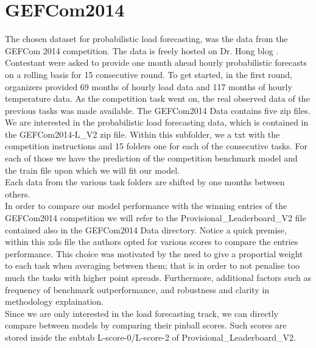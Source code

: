 \section{GEFCom2014}
The chosen dataset for probabilistic load forecasting, was the data from the GEFCom 2014 competition. The data is freely hosted on Dr. Hong blog \cite{hong2016probabilistic}.
Contestant were asked to provide one month ahead hourly probabilistic forecasts on a rolling basis for 15 consecutive round. To get started, in the first round, organizers provided 69 months of hourly load data and 117 months of hourly temperature data. As the competition task went on, the real observed data of the previous tasks was made available.
The GEFCom2014 Data contains five zip files. We are interested in the probabilistic load forecasting data, which is contained in the GEFCom2014-L\_V2 zip file. Within this subfolder, we a txt with the competition instructions and 15 folders one for each of the consecutive tasks. For each of those we have the prediction of the competition benchmark model and the train file upon which we will fit our model.
\\
Each data from the various task folders are shifted by one months between others.
\\
In order to compare our model performance with the winning entries of the GEFCom2014 competition we will refer to the Provisional\_Leaderboard\_V2 file contained also in the GEFCom2014 Data directory. Notice a quick premise, within this xsls file the authors opted for various scores to compare the entries performance. This choice was motivated by the need 
to give a proportial weight to each task when averaging between them; that is in order to not penalise too much the tasks with higher point spreads. Furthermore, additional factors such as frequency of benchmark outperformance, and robustness and clarity in methodology explaination.
\\
Since we are only interested in the load forecasting track, we can directly compare between models by comparing their pinball scores. Such scores are stored inside the subtab L-score-0/L-score-2 of Provisional\_Leaderboard\_V2.
